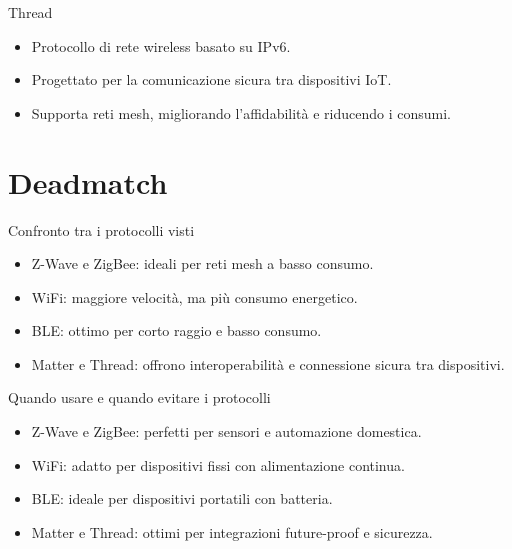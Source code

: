 \documentclass{beamer}
\begin{document}
	\begin{frame}{Thread}
		\begin{itemize}
			\item Protocollo di rete wireless basato su IPv6.
			\item Progettato per la comunicazione sicura tra dispositivi IoT.
			\item Supporta reti mesh, migliorando l'affidabilità e riducendo i consumi.
		\end{itemize}
	\end{frame}
	
	\section{Deadmatch}
	
	\begin{frame}{Confronto tra i protocolli visti}
		\begin{itemize}
			\item Z-Wave e ZigBee: ideali per reti mesh a basso consumo.
			\item WiFi: maggiore velocità, ma più consumo energetico.
			\item BLE: ottimo per corto raggio e basso consumo.
			\item Matter e Thread: offrono interoperabilità e connessione sicura tra dispositivi.
		\end{itemize}
	\end{frame}
	
	\begin{frame}{Quando usare e quando evitare i protocolli}
		\begin{itemize}
			\item Z-Wave e ZigBee: perfetti per sensori e automazione domestica.
			\item WiFi: adatto per dispositivi fissi con alimentazione continua.
			\item BLE: ideale per dispositivi portatili con batteria.
			\item Matter e Thread: ottimi per integrazioni future-proof e sicurezza.
		\end{itemize}
	\end{frame}
	
\end{document}
